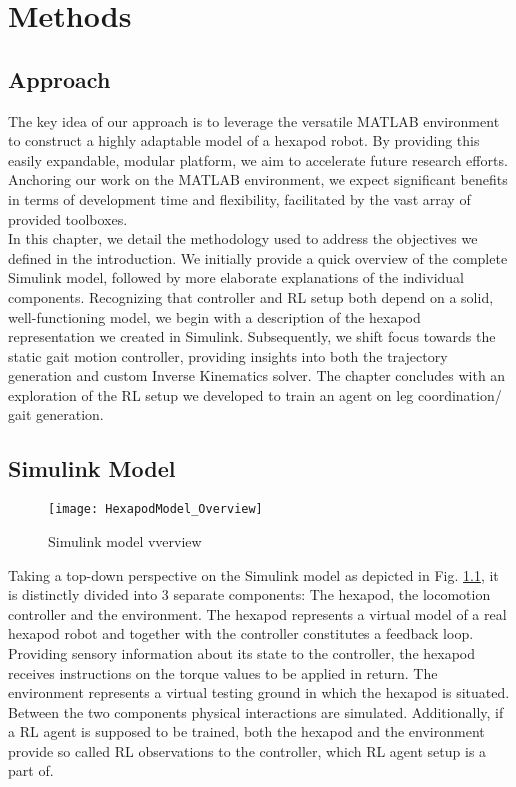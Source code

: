\chapter{Methods}
\label{ch:methods}

\section{Approach}	
The key idea of our approach is to leverage the versatile MATLAB environment to construct a highly adaptable model of a hexapod robot. 
By providing this easily expandable, modular platform, we aim to accelerate future research efforts.
Anchoring our work on the MATLAB environment, we expect significant benefits in terms of development time and flexibility, facilitated by the vast array of provided toolboxes.
\\
In this chapter, we detail the methodology used to address the objectives we defined in the introduction.
We initially provide a quick overview of the complete Simulink model, followed by more elaborate explanations of the individual components.
Recognizing that controller and RL setup both depend on a solid, well-functioning model, we begin with a description of the hexapod representation we created in Simulink.
Subsequently, we shift focus towards the static gait motion controller, providing insights into both the trajectory generation and custom Inverse Kinematics solver.
The chapter concludes with an exploration of the RL setup we developed to train an agent on leg coordination/ gait generation.

\section{Simulink Model}

\begin{figure}[h]
	\centerline{\texttt{[image: HexapodModel\_Overview]}}
	\caption[]{Simulink model vverview}
	\label{figure: Simulink Model Overview}
\end{figure}

Taking a top-down perspective on the Simulink model as depicted in Fig. \ref{figure: Simulink Model Overview}, it is distinctly divided into 3 separate components: The hexapod, the locomotion controller and the environment.
The hexapod represents a virtual model of a real hexapod robot and together with the controller constitutes a feedback loop.
Providing sensory information about its state to the controller, the hexapod receives instructions on the torque values to be applied in return.
The environment represents a virtual testing ground in which the hexapod is situated.
Between the two components physical interactions are simulated.
Additionally, if a RL agent is supposed to be trained, both the hexapod and the environment provide so called RL observations to the controller, which RL agent setup is a part of.


